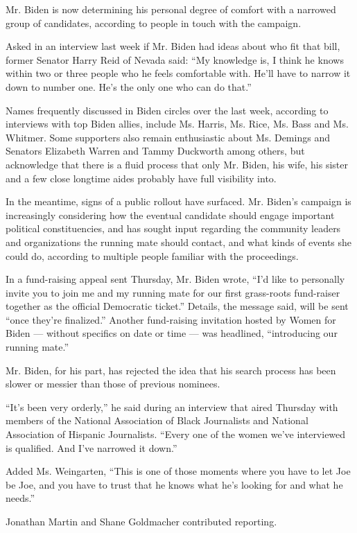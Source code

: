 Mr. Biden is now determining his personal degree of comfort with a
narrowed group of candidates, according to people in touch with the
campaign.

Asked in an interview last week if Mr. Biden had ideas about who fit
that bill, former Senator Harry Reid of Nevada said: ``My knowledge is,
I think he knows within two or three people who he feels comfortable
with. He'll have to narrow it down to number one. He's the only one who
can do that.''

Names frequently discussed in Biden circles over the last week,
according to interviews with top Biden allies, include Ms. Harris, Ms.
Rice, Ms. Bass and Ms. Whitmer. Some supporters also remain enthusiastic
about Ms. Demings and Senators Elizabeth Warren and Tammy Duckworth
among others, but acknowledge that there is a fluid process that only
Mr. Biden, his wife, his sister and a few close longtime aides probably
have full visibility into.

In the meantime, signs of a public rollout have surfaced. Mr. Biden's
campaign is increasingly considering how the eventual candidate should
engage important political constituencies, and has sought input
regarding the community leaders and organizations the running mate
should contact, and what kinds of events she could do, according to
multiple people familiar with the proceedings.

In a fund-raising appeal sent Thursday, Mr. Biden wrote, ``I'd like to
personally invite you to join me and my running mate for our first
grass-roots fund-raiser together as the official Democratic ticket.''
Details, the message said, will be sent ``once they're finalized.''
Another fund-raising invitation hosted by Women for Biden --- without
specifics on date or time --- was headlined, ``introducing our running
mate.''

Mr. Biden, for his part, has rejected the idea that his search process
has been slower or messier than those of previous nominees.

``It's been very orderly,'' he said during an interview that aired
Thursday with members of the National Association of Black Journalists
and National Association of Hispanic Journalists. ``Every one of the
women we've interviewed is qualified. And I've narrowed it down.''

Added Ms. Weingarten, ``This is one of those moments where you have to
let Joe be Joe, and you have to trust that he knows what he's looking
for and what he needs.''

Jonathan Martin and Shane Goldmacher contributed reporting.

